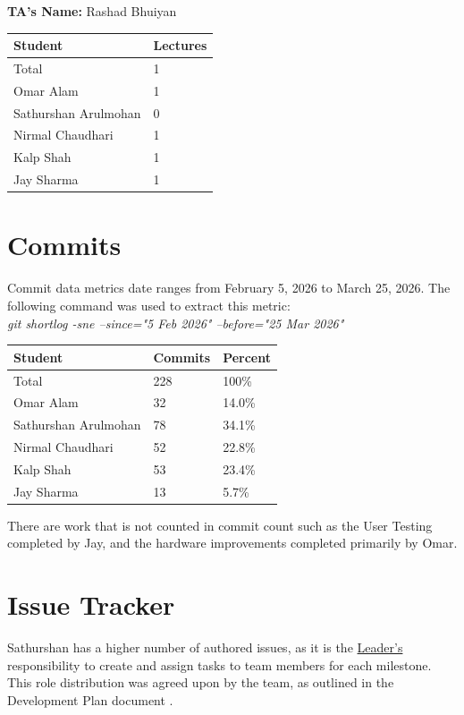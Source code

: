 \documentclass{article}
\begin{document}
\noindent \textbf{TA's Name: }Rashad Bhuiyan

\begin{table}[H]
\centering
\begin{tabular}{ll}
\toprule
\textbf{Student} & \textbf{Lectures}\\
\midrule
Total & 1\\
Omar Alam & 1 \\
Sathurshan Arulmohan & 0 \\
Nirmal Chaudhari & 1 \\
Kalp Shah & 1 \\
Jay Sharma & 1 \\
\bottomrule
\end{tabular}
\end{table}


\section{Commits}

Commit data metrics date ranges from February 5, 2026 to March 25, 2026.
The following command was used to extract this metric:\\
\textit{git shortlog -sne --since="5 Feb 2026" --before="25 Mar 2026"}

\begin{table}[H]
\centering
\begin{tabular}{lll}
\toprule
\textbf{Student} & \textbf{Commits} & \textbf{Percent}\\
\midrule
Total & 228 & 100\% \\
Omar Alam & 32 & 14.0\% \\
Sathurshan Arulmohan & 78 & 34.1\% \\
Nirmal Chaudhari & 52 & 22.8\% \\
Kalp Shah & 53 & 23.4\% \\
Jay Sharma & 13 & 5.7\% \\
\bottomrule
\end{tabular}
\end{table}

There are work that is not counted in commit count such as the User Testing
completed by Jay, and the hardware improvements completed primarily by Omar.

\section{Issue Tracker}

Sathurshan has a higher number of authored issues, as it is the
\hyperref[DevPlan-role:leader]{Leader's} responsibility to create and assign
tasks to team members for each milestone. This role distribution was agreed
upon by the team, as outlined in the Development Plan document
\cite{DevelopmentPlan}.
\end{document}
